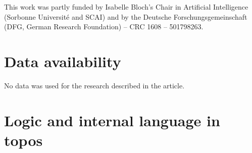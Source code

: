 \documentclass[preprint,3p,times]{elsarticle}
\begin{document}
This work was partly funded by Isabelle Bloch's Chair in Artificial Intelligence (Sorbonne Université and SCAI) and by the Deutsche Forschungsgemeinschaft (DFG, German Research Foundation) -- CRC 1608 -- 501798263.

\section*{Data availability}
No data was used for the research described in the article. 
 


\appendix

\section{Logic and internal language in topos}
\label{sec:AppB}
\end{document}
